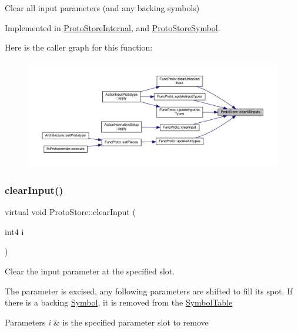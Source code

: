 Clear all input parameters (and any backing symbols) 



Implemented in \mbox{\hyperlink{class_proto_store_internal_a42caab4f3ba540a08e6c130f7e52a8ff}{Proto\+Store\+Internal}}, and \mbox{\hyperlink{class_proto_store_symbol_a4542dcfd95d5a0e225c327e40208ea71}{Proto\+Store\+Symbol}}.

Here is the caller graph for this function\+:
\nopagebreak
\begin{figure}[H]
\begin{center}
\leavevmode
\includegraphics[width=350pt]{class_proto_store_a2b2eab8f123a06bb4f4619e039bb1106_icgraph}
\end{center}
\end{figure}
\mbox{\label{class_proto_store_afa6361ac313cdd2ccef1531209389cdc}} 
\subsubsection{\texorpdfstring{clearInput()}{clearInput()}}
{\footnotesize\ttfamily virtual void Proto\+Store\+::clear\+Input (\begin{DoxyParamCaption}\item[{int4}]{i }\end{DoxyParamCaption})\hspace{0.3cm}{\ttfamily [pure virtual]}}



Clear the input parameter at the specified slot. 

The parameter is excised, any following parameters are shifted to fill its spot. If there is a backing \mbox{\hyperlink{class_symbol}{Symbol}}, it is removed from the \mbox{\hyperlink{class_symbol_table}{Symbol\+Table}} 
\begin{DoxyParams}{Parameters}
{\em i} & is the specified parameter slot to remove \\
\hline
\end{DoxyParams}


